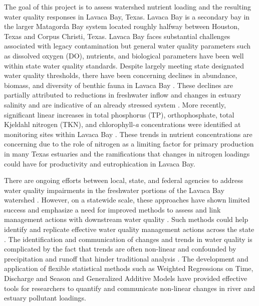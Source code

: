 \documentclass[fleqn,10pt,lineno]{wlpeerj} %
\providecommand{\DIFdelbegin}{} %
\providecommand{\DIFdelend}{} %
\begin{document}
The goal of this project is to assess watershed nutrient loading and the
resulting water quality responses in Lavaca Bay, Texas. Lavaca Bay is a
secondary bay in the larger Matagorda Bay system located roughly halfway
between Houston, Texas and Corpus Christi, Texas. Lavaca Bay faces
substantial challenges associated with legacy contamination but general
water quality parameters such as dissolved oxygen (DO), nutrients, and
biological parameters have been well within state water quality
standards. Despite largely meeting state designated water quality
thresholds, there have been concerning declines in abundance, biomass,
and diversity of benthic fauna in Lavaca Bay
\autocite{beserespollackLongtermTrendsResponse2011}. These declines are
partially attributed to reductions in freshwater inflow and changes in
estuary salinity and are indicative of an already stressed system
\autocite{beserespollackLongtermTrendsResponse2011,palmerImpactsDroughtsLow2015,montagnaAssessmentRelationshipFreshwater2020}.
More recently, significant linear increases in total phosphorus (TP),
orthophosphate, total Kjeldahl nitrogen (TKN), and chlorophyll-\emph{a}
concentrations were identified at monitoring sites within Lavaca Bay
\autocite{bugica_water_2020}. These trends in nutrient concentrations
are concerning due to the role of nitrogen as a limiting factor for
primary production in many Texas estuaries
\autocite{gardnerNitrogenFixationDissimilatory2006,houTransformationFateNitrate2012,doradoUnderstandingInteractionsFreshwater2015,paudelRelationshipSuspendedSolids2019,wetz_exceptionally_2017}
and the ramifications that changes in nitrogen loadings could have for
productivity and eutrophication in Lavaca Bay.

There are ongoing efforts between local, state, and federal agencies to
address water quality impairments in the freshwater portions of the
Lavaca Bay watershed
\autocite{jainTechnicalSupportDocument2021,schrammLavacaRiverWatershed2018,bertholdDirectMailingEducation2021}.
However, on a statewide scale, these approaches have shown limited
success and emphasize a need for improved methods to assess and link
management actions with downstream water quality
\autocite{schrammTotalMaximumDaily2022}. \DIFdelbegin %
\DIFdelend Such methods could help
identify and replicate effective water quality management actions across
the state . The identification and communication of changes and trends
in water quality is complicated by the fact that trends are often
non-linear and confounded by precipitation and runoff that hinder
traditional analysis
\autocite{wazniakLinkingWaterQuality2007,lloydMethodsDetectingChange2014}.
The development and application of flexible statistical methods such as
Weighted Regressions on Time, Discharge and Season
\autocite[WRTDS,][]{hirschWeightedRegressionsTime2010} and Generalized
Additive Models \autocite[GAMs,][]{woodFastStableRestricted2011} have
provided effective tools for researchers to quantify and communicate
non-linear changes in river and estuary pollutant loadings.
\end{document}
